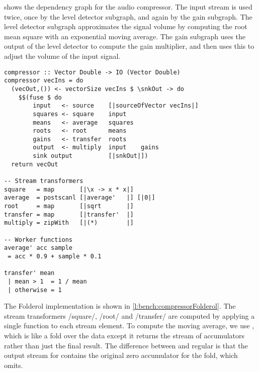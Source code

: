  shows the dependency graph for the audio compressor.
The input stream is used twice, once by the level detector subgraph, and again by the gain subgraph.
The level detector subgraph approximates the signal volume by computing the root mean square with an exponential moving average.
The gain subgraph uses the output of the level detector to compute the gain multiplier, and then uses this to adjust the volume of the input signal.

\begin{lstlisting}[float,label=l:bench:compressorFolderol,caption=Folderol implementation of \Hs/compressor/]
compressor :: Vector Double -> IO (Vector Double)
compressor vecIns = do
  (vecOut,()) <- vectorSize vecIns $ \snkOut -> do
    $$(fuse $ do
        input   <- source    [|sourceOfVector vecIns|]
        squares <- square    input
        means   <- average   squares
        roots   <- root      means
        gains   <- transfer  roots
        output  <- multiply  input    gains
        sink output          [|snkOut|])
  return vecOut

-- Stream transformers
square   = map       [|\x -> x * x|]
average  = postscanl [|average'   |] [|0|]
root     = map       [|sqrt       |]
transfer = map       [|transfer'  |]
multiply = zipWith   [|(*)        |]

-- Worker functions
average' acc sample
 = acc * 0.9 + sample * 0.1

transfer' mean
 | mean > 1  = 1 / mean
 | otherwise = 1
\end{lstlisting}

The Folderol implementation is shown in \cref{l:bench:compressorFolderol}.
The stream transformers \Hs/square/, \Hs/root/ and \Hs/transfer/ are computed by applying a single function to each stream element.
To compute the moving average, we use \Hs@postscanl@, which is like a fold over the data except it returns the stream of accumulators rather than just the final result.
The difference between \Hs@postscanl@ and regular \Hs@scanl@ is that the output stream for \Hs@scanl@ contains the original zero accumulator for the fold, which \Hs@postscanl@ omits.

